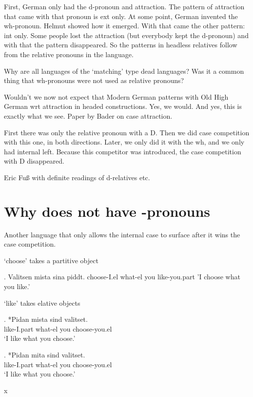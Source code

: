First, German only had the d-pronoun and attraction. The pattern of attraction that came with that pronoun is ext only.
At some point, German invented the wh-pronoun. Helmut showed how it emerged. With that came the other pattern: int only. Some people lost the attraction (but everybody kept the d-pronoun) and with that the pattern disappeared.
So the patterns in headless relatives follow from the relative pronouns in the language.

Why are all languages of the `matching' type dead languages?
Was it a common thing that wh-pronouns were not used as relative pronouns?

Wouldn't we now not expect that Modern German patterns with Old High German wrt attraction in headed constructions. Yes, we would. And yes, this is exactly what we see. Paper by Bader on case attraction.

First there was only the relative pronoun with a D. Then we did case competition with this one, in both directions. Later, we only did it with the wh, and we only had internal left. Because this competitor was introduced, the case competition with D disappeared.

Eric Fuß with definite readings of d-relatives etc.

\section{Why  does not have -pronouns}


Another language that only allows the internal case to surface after it wins the case competition.

 `choose' takes a partitive object

\ex. Valitsen mista sina piddt.
choose-I.el what-el you like-you.part
'I choose what you like.'


 `like' takes elative objects

\exg. *Pidan mista sind valitset.\\
like-I.part what-el you choose-you.el\\
`I like what you choose.'

\exg. *Pidan mita sind valitset.\\
like-I.part what-el you choose-you.el\\
`I like what you choose.'


x
